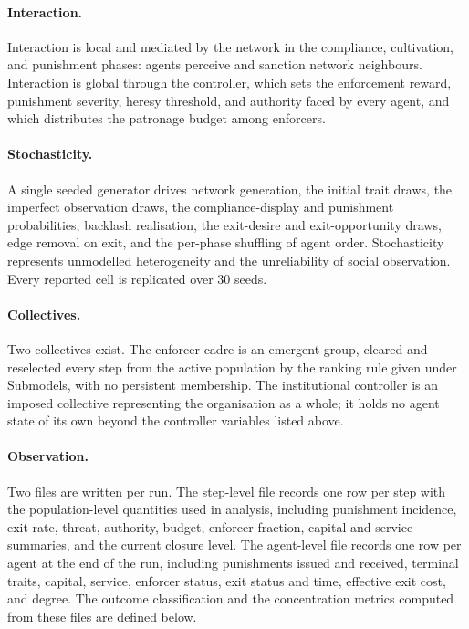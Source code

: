\documentclass[12pt]{article}
\begin{document}
\paragraph{Interaction.} Interaction is local and mediated by the network in the
compliance, cultivation, and punishment phases: agents perceive and sanction
network neighbours. Interaction is global through the controller, which sets the
enforcement reward, punishment severity, heresy threshold, and authority faced
by every agent, and which distributes the patronage budget among enforcers.

\paragraph{Stochasticity.} A single seeded generator drives network generation,
the initial trait draws, the imperfect observation draws, the compliance-display
and punishment probabilities, backlash realisation, the exit-desire and
exit-opportunity draws, edge removal on exit, and the per-phase shuffling of
agent order. Stochasticity represents unmodelled heterogeneity and the
unreliability of social observation. Every reported cell is replicated over 30
seeds.

\paragraph{Collectives.} Two collectives exist. The enforcer cadre is an
emergent group, cleared and reselected every step from the active population by
the ranking rule given under Submodels, with no persistent membership. The
institutional controller is an imposed collective representing the organisation
as a whole; it holds no agent state of its own beyond the controller variables
listed above.

\paragraph{Observation.} Two files are written per run. The step-level file
records one row per step with the population-level quantities used in analysis,
including punishment incidence, exit rate, threat, authority, budget, enforcer
fraction, capital and service summaries, and the current closure level. The
agent-level file records one row per agent at the end of the run, including
punishments issued and received, terminal traits, capital, service, enforcer
status, exit status and time, effective exit cost, and degree. The outcome
classification and the concentration metrics computed from these files are
defined below.
\end{document}
